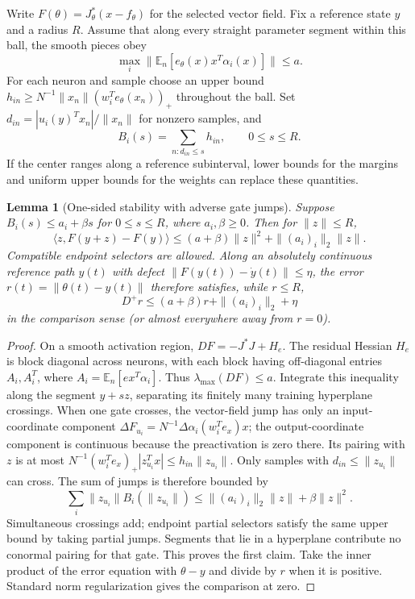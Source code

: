 \documentclass[10pt]{article}
\newtheorem{lemma}[theorem]{Lemma}
\newcommand{\E}{\mathbb E}
\begin{document}
Write $F(\theta)=J_\theta^*(x-f_\theta)$ for the selected vector field.
Fix a reference state $y$ and a radius $R$. Assume that along every straight
parameter segment within this ball, the smooth pieces obey
\[
 \max_i\|\E_n[e_\theta(x)x^T\alpha_i(x)]\|\le a.
\]
For each neuron and sample choose an upper bound
$h_{in}\ge N^{-1}\|x_n\|(w_i^Te_\theta(x_n))_+$ throughout the ball.
Set $d_{in}=|u_i(y)^Tx_n|/\|x_n\|$ for nonzero samples, and
\[
 B_i(s)=\sum_{n:d_{in}\le s}h_{in},\qquad 0\le s\le R.
\]
If the center ranges along a reference subinterval, lower bounds for the
margins and uniform upper bounds for the weights can replace these quantities.

\begin{lemma}[One-sided stability with adverse gate jumps]\label{initcert:tube}
Suppose $B_i(s)\le a_i+\beta s$ for $0\le s\le R$, where $a_i,\beta\ge0$.
Then for $\|z\|\le R$,
\[
 \langle z,F(y+z)-F(y)\rangle
 \le(a+\beta)\|z\|^2+\|(a_i)_i\|_2\|z\|.
\]
Compatible endpoint selectors are allowed. Along an absolutely continuous
reference path $y(t)$ with defect $\|F(y(t))-\dot y(t)\|\le\eta$, the
error $r(t)=\|\theta(t)-y(t)\|$ therefore satisfies, while $r\le R$,
\[
 D^+r\le(a+\beta)r+\|(a_i)_i\|_2+\eta
\]
in the comparison sense (or almost everywhere away from $r=0$).
\end{lemma}
\begin{proof}
On a smooth activation region,
$DF=-J^*J+H_e$. The residual Hessian $H_e$ is block diagonal across
neurons, with each block having off-diagonal entries $A_i,A_i^T$, where
$A_i=\E_n[e x^T\alpha_i]$. Thus $\lambda_{\max}(DF)\le a$.
Integrate this inequality along the segment $y+sz$, separating its finitely
many training hyperplane crossings. When one gate crosses, the vector-field
jump has only an input-coordinate component
$\Delta F_{u_i}=N^{-1}\Delta\alpha_i(w_i^Te_x)x$; the output-coordinate
component is continuous because the preactivation is zero there. Its pairing
with $z$ is at most
$N^{-1}(w_i^Te_x)_+|z_{u_i}^Tx|\le h_{in}\|z_{u_i}\|$.
Only samples with $d_{in}\le\|z_{u_i}\|$ can cross. The sum of jumps is
therefore bounded by
\[
 \sum_i\|z_{u_i}\|B_i(\|z_{u_i}\|)
 \le\|(a_i)_i\|_2\|z\|+\beta\|z\|^2.
\]
Simultaneous crossings add; endpoint partial selectors satisfy the same
upper bound by taking partial jumps. Segments that lie in a hyperplane
contribute no conormal pairing for that gate. This proves the first claim.
Take the inner product of the error equation with $\theta-y$ and divide
by $r$ when it is positive. Standard norm regularization gives the comparison
at zero.
\end{proof}
\end{document}
